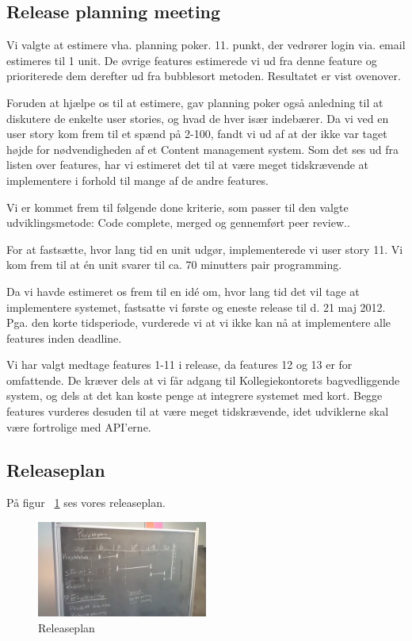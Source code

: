 \documentclass[12pt, a4paper]{report}
\begin{document}
\subsection{Release planning meeting}

Vi valgte at estimere vha. planning poker. 11. punkt, der vedrører login via. email estimeres til 1 unit. De øvrige features estimerede vi  ud fra denne feature og prioriterede dem derefter ud fra bubblesort metoden. Resultatet er vist ovenover.

Foruden at hjælpe os til at estimere, gav planning poker også anledning til at diskutere de enkelte user stories, og hvad de hver især indebærer. Da vi ved en user story kom frem til et spænd på 2-100, fandt vi ud af at der ikke var taget højde for nødvendigheden af et Content management system. Som det ses ud fra listen over features, har vi estimeret det til at være meget tidskrævende at implementere i forhold til mange af de andre features.

Vi er kommet frem til følgende done kriterie, som passer til den valgte udviklingsmetode: Code complete, merged og gennemført peer review..

For at fastsætte, hvor lang tid en unit udgør, implementerede vi user story 11. Vi kom frem til at én unit svarer til ca. 70 minutters pair programming.

Da vi havde estimeret os frem til en idé om, hvor lang tid det vil tage at implementere systemet, fastsatte vi første og eneste release til d. 21 maj 2012. Pga. den korte tidsperiode, vurderede vi at vi ikke kan nå at implementere alle features inden deadline.

Vi har valgt medtage features 1-11 i release, da features 12 og 13 er for omfattende. De kræver dels at vi får adgang til Kollegiekontorets bagvedliggende system, og dels at det kan koste penge at integrere systemet med kort. Begge features vurderes desuden til at være meget tidskrævende, idet udviklerne skal være fortrolige med API’erne.

\subsection{Releaseplan}
På figur ~\ref{release_plan} ses vores releaseplan.
\begin{figure}[ht]
\centering
\includegraphics[width=0.5\textwidth]{releaseplan}
\caption{Releaseplan}
\label{release_plan}
\end{figure}
\end{document}
